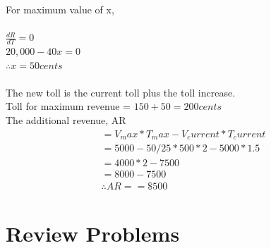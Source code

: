 For maximum value of x,\\\\
$\frac{dR}{dT} = 0$\\
$20,000 -40x = 0$\\
$\therefore x = 50 cents$\\\\
The new toll is the current toll plus the toll increase.\\
Toll for maximum revenue = $150 +50 = 200cents$\\
The additional revenue, AR
\begin{gather*}
	= V_max *  T_max - V_current * T_current\\
	= {5000 - 50/25 * 500} * 2 - 5000 * 1.5\\
	= 4000 *2 - 7500\\
	= 8000 - 7500\\
	\therefore AR = =\$500
\end{gather*}
\section{Review Problems}



